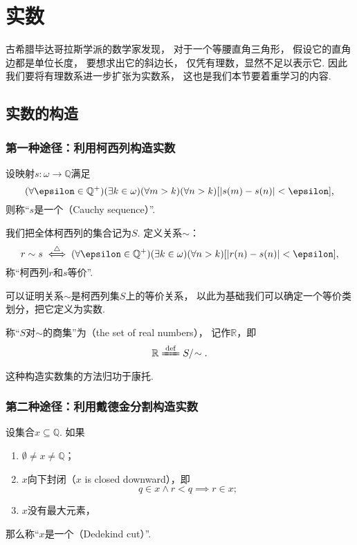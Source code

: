 \section{实数}
古希腊毕达哥拉斯学派的数学家发现，
对于一个等腰直角三角形，
假设它的直角边都是单位长度，
要想求出它的斜边长，
仅凭有理数，显然不足以表示它.
因此我们要将有理数系进一步扩张为实数系，
这也是我们本节要着重学习的内容.

\subsection{实数的构造}
\subsubsection*{第一种途径：利用柯西列构造实数}
\begin{definition}
设映射\(s\colon \omega\to\mathbb{Q}\)满足\[
	(\forall\epsilon\in\mathbb{Q}^+)(\exists k\in\omega)(\forall m>k)(\forall n>k)
	[\abs{s(m) - s(n)}<\epsilon],
\]
则称“\(s\)是一个（Cauchy sequence）”.
\end{definition}

\begin{definition}
我们把全体柯西列的集合记为\(S\).
定义关系\(\sim\)：\[
	r \sim s
	\defiff
	(\forall\epsilon\in\mathbb{Q}^+)(\exists k\in\omega)(\forall n>k)
	[\abs{r(n)-s(n)}<\epsilon],
\]
称“柯西列\(r\)和\(s\)等价”.
\end{definition}

可以证明关系\(\sim\)是柯西列集\(S\)上的等价关系，
以此为基础我们可以确定一个等价类划分，把它定义为实数.
\begin{definition}
称“\(S\)对\(\sim\)的商集”为（the set of real numbers），
记作\(\mathbb{R}\)，即\[
	\mathbb{R} \defeq S/\kern-2pt\sim.
\]
\end{definition}
这种构造实数集的方法归功于康托.

\subsubsection*{第二种途径：利用戴德金分割构造实数}
\begin{definition}
设集合\(x \subseteq \mathbb{Q}\).
如果\begin{enumerate}
	\item \(\emptyset \neq x \neq \mathbb{Q}\)；
	\item \(x\)向下封闭（\(x\) is closed downward），即\[
		q \in x \land r < q \implies r \in x;
	\]
	\item \(x\)没有最大元素，
\end{enumerate}
那么称“\(x\)是一个（Dedekind cut）”.
\end{definition}

